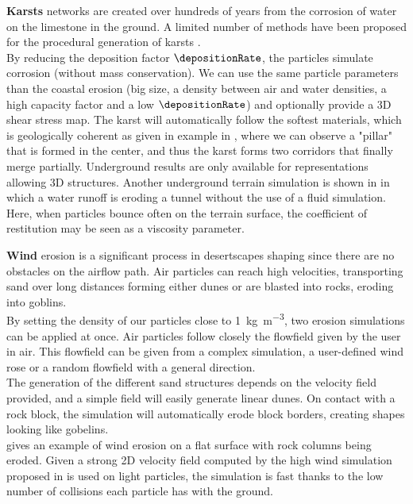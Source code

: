 \textbf{Karsts} networks are created over hundreds of years from the corrosion of water on the limestone in the ground. A limited number of methods have been proposed for the procedural generation of karsts \cite{Paris2021}.\\ 
By reducing the deposition factor $\depositionRate$, the particles simulate corrosion (without mass conservation). We can use the same particle parameters than the coastal erosion (big size, a density between air and water densities, a high capacity factor and a low $\depositionRate$) and optionally provide a 3D shear stress map. The karst will automatically follow the softest materials, which is geologically coherent as given in example in , where we can observe a "pillar" that is formed in the center, and thus the karst forms two corridors that finally merge partially. 
%
Underground results are only available for representations allowing 3D structures. Another underground terrain simulation is shown in  in which a water runoff is eroding a tunnel without the use of a fluid simulation. Here, when particles bounce often on the terrain surface, the coefficient of restitution may be seen as a viscosity parameter.

\textbf{Wind}
erosion is a significant process in desertscapes shaping since there are no obstacles on the airflow path. Air particles can reach high velocities, transporting sand over long distances forming either dunes or are blasted into rocks, eroding into goblins. \\ 
By setting the density of our particles close to \SI{1}{\kilogram\per\cubic\meter}, two erosion simulations can be applied at once. Air particles follow closely the flowfield given by the user in air. This flowfield can be given from a complex simulation, a user-defined wind rose \cite{Paris2020} or a random flowfield with a general direction. \\ 
The generation of the different sand structures depends on the velocity field provided, and a simple field will easily generate linear dunes. On contact with a rock block, the simulation will automatically erode block borders, creating shapes looking like gobelins. \\
 gives an example of wind erosion on a flat surface with rock columns being eroded. Given a strong 2D velocity field computed by the high wind simulation proposed in \cite{Paris2020} is used on light particles, the simulation is fast thanks to the low number of collisions each particle has with the ground. 

